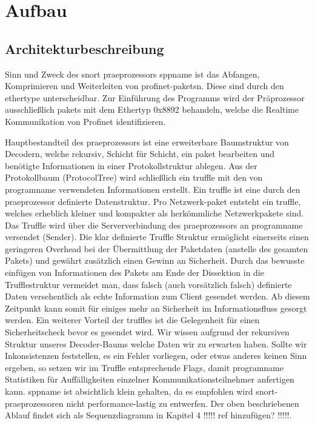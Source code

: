 \chapter{Aufbau \sppname}

\section{Architekturbeschreibung}

Sinn und Zweck des \gls{snort} \gls{praeprozessor}s \gls{sppname} ist das Abfangen,
Komprimieren und Weiterleiten von \gls{profinet}-\glspl{paket}n. Diese
sind durch den \gls{ethertype} unterscheidbar. Zur Einführung des Programms wird der Präprozessor ausschließlich \glspl{paket} mit dem Ethertyp 0x8892 behandeln, welche die Realtime Kommunikation von Profinet identifizieren.

Hauptbestandteil des \gls{praeprozessor}s ist eine erweiterbare Baumstruktur von Decodern, welche rekursiv, Schicht für Schicht, ein \gls{paket} bearbeiten und benötigte Informationen in einer Protokollstruktur ablegen. Aus der Protokollbaum (ProtocolTree) wird schließlich ein \gls{truffle} mit den von \gls{programname} verwendeten Informationen erstellt. Ein \gls{truffle} ist eine durch den \gls{praeprozessor} definierte Datenstruktur.
Pro Netzwerk-\gls{paket} entsteht ein \gls{truffle}, welches erheblich kleiner und kompakter als herkömmliche Netzwerkpakete sind. Das Truffle wird über die Serververbindung des {praeprozessor}s
an \gls{programname} versendet (Sender). Die klar definierte Truffle Struktur ermöglicht einerseits einen geringeren Overhead bei der Übermittlung der Paketdaten (anstelle des gesamten Pakets) und gewährt zusätzlich einen Gewinn an Sicherheit. Durch das bewusste einfügen von Informationen des Pakets am Ende der Dissektion in die Trufflestruktur vermeidet man, dass falsch (auch vorsätzlich falsch) definierte Daten versehentlich als echte Information zum Client gesendet werden. Ab diesem Zeitpunkt kann somit für einiges mehr an Sicherheit im Informationsfluss gesorgt werden.
Ein weiterer Vorteil der \glspl{truffle} ist die Gelegenheit für einen Sicherheitscheck bevor es gesendet wird. Wir wissen aufgrund der rekursiven Struktur unseres Decoder-Baums welche Daten wir zu erwarten haben. Sollte wir Inkonsistenzen feststellen, es ein Fehler vorliegen, oder etwas anderes keinen Sinn ergeben, so setzen wir im Truffle entsprechende Flags, damit \gls{programname} Statistiken für Auffälligkeiten einzelner Kommunikationsteilnehmer anfertigen kann.\newline
\gls{sppname} ist absichtlich klein gehalten, da es empfohlen wird \gls{snort}-\gls{praeprozessor}en nicht performance-lastig zu entwerfen. Der oben beschriebenen Ablauf findet sich als Sequenzdiagramm in Kapitel 4 !!!!! ref hinzufügen? !!!!!.


